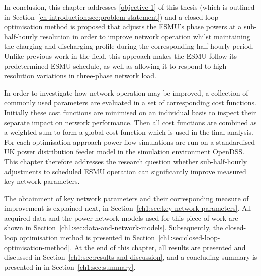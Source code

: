 In conclusion, this chapter addresses \ref{objective-1} of this thesis (which is outlined in Section~\ref{ch-introduction:sec:problem-statement}) and a closed-loop optimisation method is proposed that adjusts the ESMU's phase powers at a sub-half-hourly resolution in order to improve network operation whilst maintaining the charging and discharging profile during the corresponding half-hourly period.
Unlike previous work in the field, this approach makes the ESMU follow its  predetermined ESMU schedule, as well as allowing it to respond to high-resolution variations in three-phase network load.

In order to investigate how network operation may be improved, a collection of commonly used parameters are evaluated in a set of corresponding cost functions.
Initially these cost functions are minimised on an individual basis to inspect their separate impact on network performance.
Then all cost functions are combined as a weighted sum to form a global cost function which is used in the final analysis.
For each optimisation approach power flow simulations are run on a standardised UK power distribution feeder model in the simulation environment OpenDSS.
This chapter therefore addresses the research question whether sub-half-hourly adjustments to scheduled ESMU operation can significantly improve measured key network parameters.

The obtainment of key network parameters and their corresponding measure of improvement is explained next, in Section~\ref{ch1:sec:key-network-parameters}.
All acquired data and the power network models used for this piece of work are shown in Section~\ref{ch1:sec:data-and-network-models}.
Subsequently, the closed-loop optimisation method is presented in Section~\ref{ch1:sec:closed-loop-optimisation-method}.
At the end of this chapter, all results are presented and discussed in Section~\ref{ch1:sec:results-and-discussion}, and a concluding summary is presented in in Section~\ref{ch1:sec:summary}.

